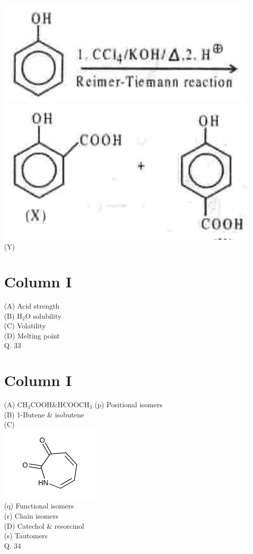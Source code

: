 \documentclass[10pt]{article}
\begin{document}
\includegraphics[max width=\textwidth, center]{2025_01_28_8470952b98110cec3aabg-149}\\
\includegraphics[max width=\textwidth, center]{2025_01_28_8470952b98110cec3aabg-149(1)}\\
(Y)

\section*{Column I}
(A) Acid strength\\
(B) $\mathrm{H}_{2} \mathrm{O}$ solubility\\
(C) Volatility\\
(D) Melting point\\
Q. 33

\section*{Column I}
(A) $\mathrm{CH}_{3} \mathrm{COOH} \& \mathrm{HCOOCH}_{3}$ (p) Positional isomers\\
(B) 1-Butene \& isobutene\\
(C)\\
\includegraphics{smile-b4219f028a84db483333a100e4bb937953d76474}\\
(q) Functional isomers\\
(r) Chain isomers\\
(D) Catechol \& resorcinol\\
(s) Tautomers\\
Q. 34
\end{document}
